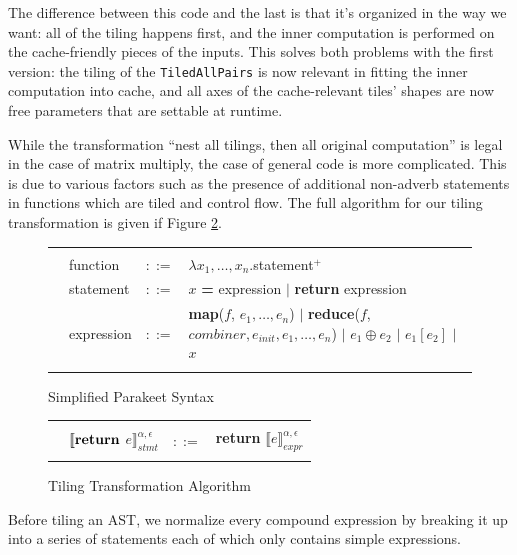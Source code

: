 \documentclass[preprint,9pt]{sigplanconf}
\begin{document}
The difference between this code and the last is that it's organized in the way we want: all of the tiling happens first, and the inner computation is performed on the cache-friendly pieces of the inputs. This solves both problems with the first version: the tiling of the \lstinline{TiledAllPairs} is now relevant in fitting the inner computation into cache, and all axes of the cache-relevant tiles' shapes are now free parameters that are settable at runtime.

While the transformation ``nest all tilings, then all original computation'' is legal in the case of matrix multiply, the case of general code is more complicated.  This is due to various factors such as the presence of additional non-adverb statements in functions which are tiled and control flow.  The full algorithm for our tiling transformation is given if Figure \ref{tiling_algorithm}.

\begin{figure}[!t]
\centering
{\large
\begin{tabular}{| m{0.01cm}llm{13.8cm} |}
\hline
& & &\\
& function   & $::=$ & $\lambda x_1,\ldots,x_n.$statement$^+$\\
& statement  & $::=$ & $x$ \textbf{= } expression $|$ \textbf{return} expression\\
& expression & $::=$ & \textbf{map}($f$, $e_1,\ldots,e_n$) $|$ \textbf{reduce}($f$, $combiner, e_{init}, e_1,\ldots,e_n$) $|$ $e_1 \oplus e_2 $ $|$ $e_1[e_2]$ $|$ $x$\\
& & &\\
\hline
\end{tabular}
}
\caption{Simplified Parakeet Syntax}
\label{tiling_syntax}
\end{figure}

\begin{figure}
\centering
{\large
\begin{tabular}{| m{0.01cm}llm{14cm} |}
\hline
& & &\\
& $\llbracket\textbf{\textrm{return}}$ $e\rrbracket^{\alpha,\epsilon}_{stmt}$ & $::=$ & \textbf{return} $\llbracket e \rrbracket^{\alpha,\epsilon}_{expr}$\\
& & &\\
\hline
\end{tabular}
}
\caption{Tiling Transformation Algorithm}
\label{tiling_algorithm}
\end{figure}

Before tiling an AST, we normalize every compound expression by breaking it up into a series of statements each of which only contains simple expressions.
\end{document}
